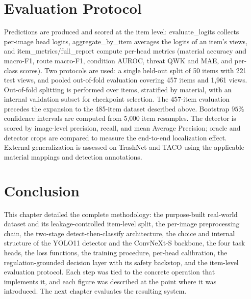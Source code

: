 \section{Evaluation Protocol}
Predictions are produced and scored at the item level: evaluate\_logits collects per-image head logits, aggregate\_by\_item averages the logits of an item's views, and item\_metrics/full\_report compute per-head metrics (material accuracy and macro-F1, route macro-F1, condition AUROC, threat QWK and MAE, and per-class scores). Two protocols are used: a single held-out split of 50 items with 221 test views, and pooled out-of-fold evaluation covering 457 items and 1{,}961 views. Out-of-fold splitting is performed over items, stratified by material, with an internal validation subset for checkpoint selection. The 457-item evaluation precedes the expansion to the 485-item dataset described above. Bootstrap $95\%$ confidence intervals are computed from 5{,}000 item resamples. The detector is scored by image-level precision, recall, and mean Average Precision; oracle and detector crops are compared to measure the end-to-end localization effect. External generalization is assessed on TrashNet and TACO using the applicable material mappings and detection annotations.

\section{Conclusion}
This chapter detailed the complete methodology: the purpose-built real-world dataset and its leakage-controlled item-level split, the per-image preprocessing chain, the two-stage detect-then-classify architecture, the choice and internal structure of the YOLO11 detector and the ConvNeXt-S backbone, the four task heads, the loss functions, the training procedure, per-head calibration, the regulation-grounded decision layer with its safety backstop, and the item-level evaluation protocol. Each step was tied to the concrete operation that implements it, and each figure was described at the point where it was introduced. The next chapter evaluates the resulting system.
